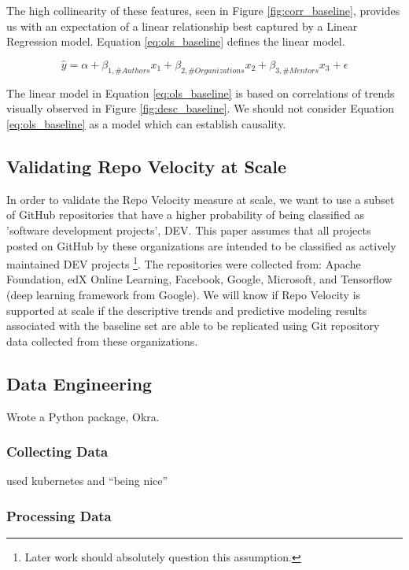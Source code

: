 \documentclass{article}
\begin{document}
The high collinearity of these features, seen in Figure
\ref{fig:corr_baseline}, provides us with an expectation of a linear
relationship best captured by a Linear Regression model. Equation
\ref{eq:ols_baseline} defines the linear model.

\begin{equation}
  \label{eq:ols_baseline}
  \hat{y} = \alpha + \beta_{1, \# Authors}x_1 + \beta_{2, \# Organizations}
  x_2 + \beta_{3, \# Mentors}x_3 + \epsilon
\end{equation}

The linear model in Equation \ref{eq:ols_baseline} is based on correlations
of trends visually observed in Figure \ref{fig:desc_baseline}. We should
not consider Equation \ref{eq:ols_baseline} as a model which can establish
causality.

\subsection{Validating Repo Velocity at Scale}

In order to validate the Repo Velocity measure at scale, we want to
use a subset of GitHub repositories that have a higher probability of
being classified as 'software development projects', DEV. This paper assumes
that all projects posted on GitHub by these organizations are intended to
be classified as actively maintained DEV projects \footnote{Later work should absolutely question this assumption.}. The repositories were collected
from: Apache Foundation, edX Online Learning, Facebook, Google, Microsoft,
and Tensorflow (deep learning framework from Google). We will know if
Repo Velocity is supported at scale if the descriptive trends and predictive
modeling results associated with the baseline set are able to be replicated
using Git repository data collected from these organizations.

\subsection{Data Engineering}

Wrote a Python package, Okra.

\subsubsection{Collecting Data}

used kubernetes and ``being nice''

\subsubsection{Processing Data}
\end{document}
